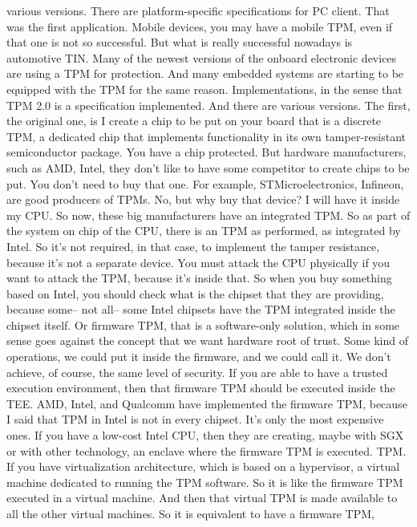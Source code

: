  various versions. There are platform-specific specifications for PC client.
 That was the first application. Mobile devices, you may have a mobile TPM,
 even if that one is not so successful. But what is really successful nowadays
 is automotive TIN. Many of the newest versions of the onboard electronic
 devices are using a TPM for protection. And many embedded systems are starting
 to be equipped with the TPM for the same reason. Implementations, in the sense
 that TPM 2.0 is a specification implemented. And there are various versions.
 The first, the original one, is I create a chip to be put on your board that
 is a discrete TPM, a dedicated chip that implements functionality in its own
 tamper-resistant semiconductor package. You have a chip protected. But
 hardware manufacturers, such as AMD, Intel, they don't like to have some
 competitor to create chips to be put. You don't need to buy that one. For
 example, STMicroelectronics, Infineon, are good producers of TPMs. No, but why
 buy that device? I will have it inside my CPU. So now, these big manufacturers
 have an integrated TPM. So as part of the system on chip of the CPU, there is
 an TPM as performed, as integrated by Intel. So it's not required, in that
 case, to implement the tamper resistance, because it's not a separate device.
 You must attack the CPU physically if you want to attack the TPM, because it's
 inside that. So when you buy something based on Intel, you should check what
 is the chipset that they are providing, because some-- not all-- some Intel
 chipsets have the TPM integrated inside the chipset itself. Or firmware TPM,
 that is a software-only solution, which in some sense goes against the concept
 that we want hardware root of trust. Some kind of operations, we could put it
 inside the firmware, and we could call it. We don't achieve, of course, the
 same level of security. If you are able to have a trusted execution
 environment, then that firmware TPM should be executed inside the TEE. AMD,
 Intel, and Qualcomm have implemented the firmware TPM, because I said that TPM
 in Intel is not in every chipset. It's only the most expensive ones. If you
 have a low-cost Intel CPU, then they are creating, maybe with SGX or with
 other technology, an enclave where the firmware TPM is executed. TPM. If you
 have virtualization architecture, which is based on a hypervisor, a virtual
 machine dedicated to running the TPM software. So it is like the firmware TPM
 executed in a virtual machine. And then that virtual TPM is made available to
 all the other virtual machines. So it is equivalent to have a firmware TPM,
